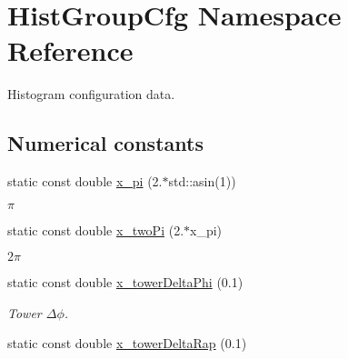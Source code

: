 \hypertarget{namespaceHistGroupCfg}{
\section{Hist\-Group\-Cfg Namespace Reference}
\label{namespaceHistGroupCfg}
}
Histogram configuration data.  


\subsection*{Numerical constants}
\begin{CompactItemize}
\item 
\hypertarget{namespaceHistGroupCfg_3d9150487eec5af48110f9056d9fc4af}{
static const double \hyperlink{namespaceHistGroupCfg_3d9150487eec5af48110f9056d9fc4af}{x\_\-pi} (2.$\ast$std::asin(1))}
\label{namespaceHistGroupCfg_3d9150487eec5af48110f9056d9fc4af}

\begin{CompactList}\small\item\em $\pi$ \item\end{CompactList}\item 
\hypertarget{namespaceHistGroupCfg_cef9cad579a1e00b7bde8a4983a5ac5a}{
static const double \hyperlink{namespaceHistGroupCfg_cef9cad579a1e00b7bde8a4983a5ac5a}{x\_\-two\-Pi} (2.$\ast$x\_\-pi)}
\label{namespaceHistGroupCfg_cef9cad579a1e00b7bde8a4983a5ac5a}

\begin{CompactList}\small\item\em $2 \pi$ \item\end{CompactList}\item 
\hypertarget{namespaceHistGroupCfg_55a35cac83020bf2f59cbd28ac3785ba}{
static const double \hyperlink{namespaceHistGroupCfg_55a35cac83020bf2f59cbd28ac3785ba}{x\_\-tower\-Delta\-Phi} (0.1)}
\label{namespaceHistGroupCfg_55a35cac83020bf2f59cbd28ac3785ba}

\begin{CompactList}\small\item\em Tower $\Delta\phi$. \item\end{CompactList}\item 
\hypertarget{namespaceHistGroupCfg_91e9538e949af0bb10b057e98ab33af6}{
static const double \hyperlink{namespaceHistGroupCfg_91e9538e949af0bb10b057e98ab33af6}{x\_\-tower\-Delta\-Rap} (0.1)}
\label{namespaceHistGroupCfg_91e9538e949af0bb10b057e98ab33af6}


\end{CompactItemize}
